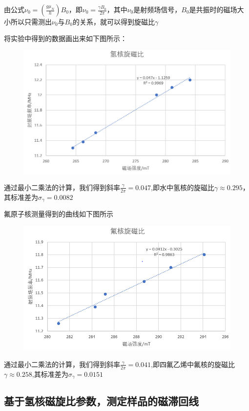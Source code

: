 \documentclass{ctexart}
\begin{document}
	由公式$\nu_0=(\frac{g\mu_N}{h})B_0$，即$\nu_0=\frac{\gamma B_0}{2\pi}$，其中$\nu_0$是射频场信号，$B_0$是共振时的磁场大小所以只需测出$\nu_0$与$B_0$的关系，就可以得到旋磁比$\gamma$
	
	将实验中得到的数据画出来如下图所示：
	\begin{figure}[H]
		\centering
		\includegraphics[scale=0.9]{氢核旋磁比}
	\end{figure}
  
	通过最小二乘法的计算，我们得到斜率$\frac{\gamma}{2\pi}=0.047$,即水中氢核的旋磁比$\gamma \approx 0.295$，其标准差为$\sigma_\gamma=0.0082$
	
	氟原子核测量得到的曲线如下图所示
	\begin{figure}[H]
		\centering
		\includegraphics[scale=0.9]{氟核旋磁比}
	\end{figure}
	通过最小二乘法的计算，我们得到斜率$\frac{\gamma}{2\pi}=0.041$,即四氟乙烯中氟核的旋磁比$\gamma \approx 0.258$,其标准差为$\sigma_\gamma=0.0151$
\subsection{基于氢核磁旋比参数，测定样品的磁滞回线}
\end{document}
